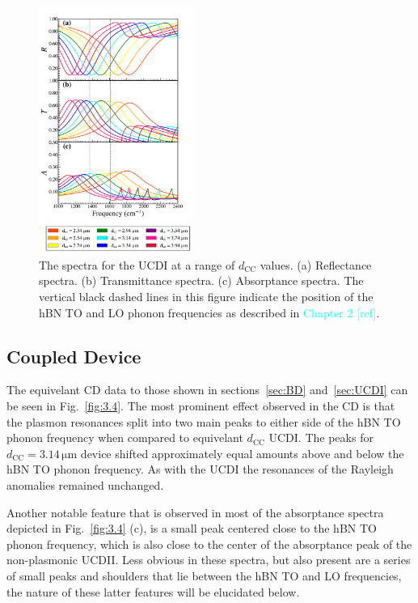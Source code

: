 \documentclass[preprint,
amsmath,amssymb,
aip,
jap,
floatfix,]{revtex4-2}
\begin{document}
			\begin{figure}[!htb]
			  \centering\includegraphics[width=0.45\textwidth]{Figures/UncRTA1000_2400.png}
			  \caption{The spectra for the UCDI at a range of $d_\mathrm{CC}$ values. (a) Reflectance spectra. (b) Transmittance spectra. (c) Absorptance spectra.  The vertical black dashed lines in this figure indicate the position of the hBN TO and LO phonon frequencies as described in \textcolor{cyan}{Chapter 2 [ref]}.}
			  \label{fig:3.3}
			\end{figure}
			
		\subsection{Coupled Device}
		\label{sec:CD}
			The equivelant CD data to those shown in sections~\ref{sec:BD} and~\ref{sec:UCDI} can be seen in Fig.~\ref{fig:3.4}. The most prominent effect observed in the CD is that the plasmon resonances split into two main peaks to either side of the hBN TO phonon frequency when compared to equivelant $d_\mathrm{CC}$ UCDI. The peaks for $d_\mathrm{CC} = 3.14\,\si{\um}$ device shifted approximately equal amounts above and below the hBN TO phonon frequency. As with the UCDI the resonances of the Rayleigh anomalies remained unchanged.

			Another notable feature that is observed in most of the absorptance spectra depicted in Fig.~\ref{fig:3.4} (c), is a small peak centered close to the hBN TO phonon frequency, which is also close to  the center of the absorptance peak of the non-plasmonic UCDII. Less obvious in these spectra, but also present are a series of small peaks and shoulders that lie between the hBN TO and LO frequencies, the nature of these latter features will be elucidated below.
\end{document}

